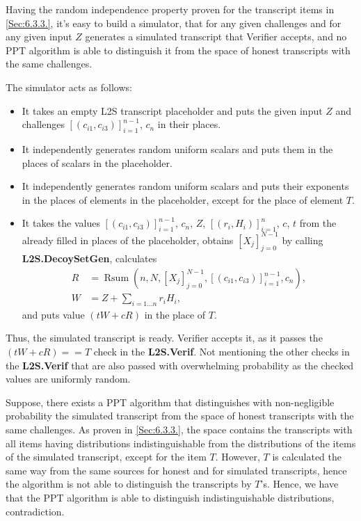 \documentclass{mathcryptology} %
\DeclareMathOperator{\Rsum}{Rsum}
\theoremstyle{title}
\theoremstyle{titleof}
\begin{document}
    Having the random independence property proven for the transcript items in \ref{Sec:6.3.3.}, it's easy to build a simulator, that for any given challenges and for any given input $Z$ generates a simulated transcript that Verifier accepts, and no PPT algorithm is able to distinguish it from the space of honest transcripts with the same challenges.

    The simulator acts as follows:
    \begin{itemize}
        \item It takes an empty L2S transcript placeholder and puts the given input $Z$ and challenges ${\left[\left(c_{i1},c_{i3}\right)\right]}_{i=1}^{n-1}$, $c_{n}$ in their places.
        \item It independently generates random uniform scalars and puts them in the places of scalars in the placeholder.
        \item It independently generates random uniform scalars and puts their exponents in the places of elements in the placeholder, except for the place of element $T$.
        \item It takes the values ${\left[\left(c_{i1},c_{i3}\right)\right]}_{i=1}^{n-1}$, $c_{n}$, $Z$, ${\left[\left(r_{i}, H_{i}\right)\right]}_{i=1}^{n}$, $c$, $t$ from the already filled in places of the placeholder, obtains ${\left[X_{j}\right]}_{j=0}^{N-1}$ by calling \textbf{L2S.DecoySetGen}, calculates
        \begin{align*}
            R & = \Rsum \left(n, N, {\left[X_{j}\right]}_{j=0}^{N-1},
            {\left[\left(c_{i1},c_{i3}\right)\right]}_{i=1}^{n-1},
            c_{n}\right), \\
            W & = Z + \sum_{i=1\dots{}n}r_iH_i,
        \end{align*}
        and puts value $\left(tW+cR\right)$ in the place of $T$.
    \end{itemize}
    Thus, the simulated transcript is ready. Verifier accepts it, as it passes the $\left(tW+cR\right)==T$ check in the \textbf{L2S.Verif}. Not mentioning the other checks in the \textbf{L2S.Verif} that are also passed with overwhelming probability as the checked values are uniformly random. 

    Suppose, there exists a PPT algorithm that distinguishes with non-negligible probability the simulated transcript from the space of honest transcripts with the same challenges. As proven in \ref{Sec:6.3.3.}, the space contains the transcripts with all items having distributions indistinguishable from the distributions of the items of the simulated transcript, except for the item $T$. However, $T$ is calculated the same way from the same sources for honest and for simulated transcripts, hence the algorithm is not able to distinguish the transcripts by $T$'s. Hence, we have that the PPT algorithm is able to distinguish indistinguishable distributions, contradiction.
\end{document}
